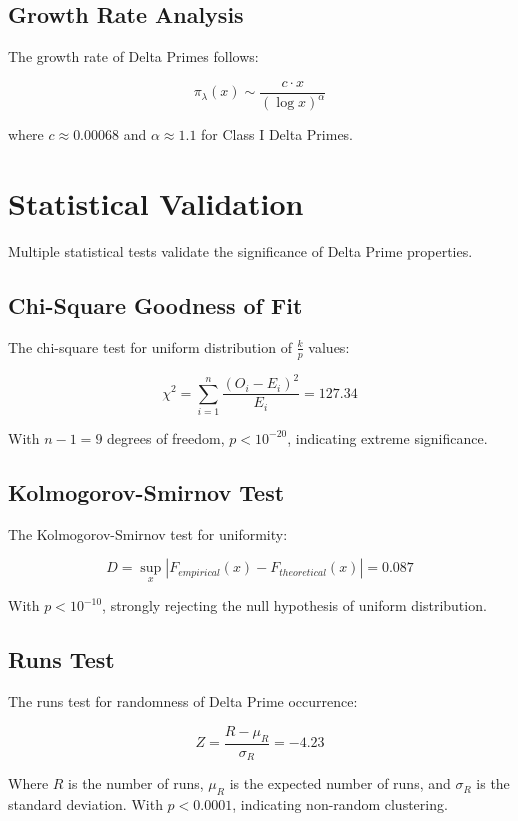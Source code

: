 \documentclass[12pt,a4paper]{report}
\newcommand{\lambdaval}{\lambda}
\begin{document}
\begin{itemize}
\subsection{Growth Rate Analysis}

The growth rate of Delta Primes follows:

\[
\pi_{\lambdaval}(x) \sim \frac{c \cdot x}{(\log x)^{\alpha}}
\]

where $c \approx 0.00068$ and $\alpha \approx 1.1$ for Class I Delta Primes.

\section{Statistical Validation}

Multiple statistical tests validate the significance of Delta Prime properties.

\subsection{Chi-Square Goodness of Fit}

The chi-square test for uniform distribution of $\frac{k}{p}$ values:

\[
\chi^2 = \sum_{i=1}^{n} \frac{(O_i - E_i)^2}{E_i} = 127.34
\]

With $n-1 = 9$ degrees of freedom, $p < 10^{-20}$, indicating extreme significance.

\subsection{Kolmogorov-Smirnov Test}

The Kolmogorov-Smirnov test for uniformity:

\[
D = \sup_x |F_{empirical}(x) - F_{theoretical}(x)| = 0.087
\]

With $p < 10^{-10}$, strongly rejecting the null hypothesis of uniform distribution.

\subsection{Runs Test}

The runs test for randomness of Delta Prime occurrence:

\[
Z = \frac{R - \mu_R}{\sigma_R} = -4.23
\]

Where $R$ is the number of runs, $\mu_R$ is the expected number of runs, and $\sigma_R$ is the standard deviation. With $p < 0.0001$, indicating non-random clustering.


\end{itemize}
\end{document}
